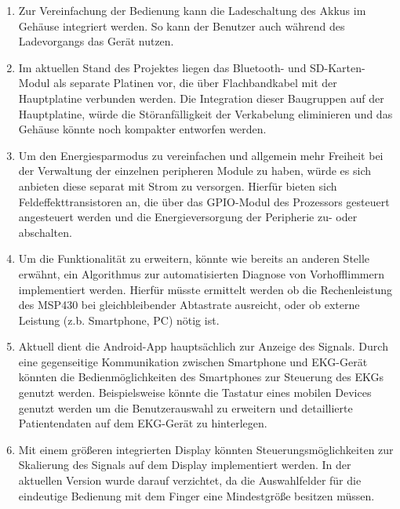 \begin{enumerate}

\item Zur Vereinfachung der Bedienung kann die Ladeschaltung des Akkus im Gehäuse integriert werden. So kann der Benutzer auch während des Ladevorgangs das Gerät nutzen.

\item Im aktuellen Stand des Projektes liegen das Bluetooth- und SD-Karten-Modul als separate Platinen vor, die über Flachbandkabel mit der Hauptplatine verbunden werden. Die Integration dieser Baugruppen auf der Hauptplatine, würde die Störanfälligkeit der Verkabelung eliminieren und das Gehäuse könnte noch kompakter entworfen werden.

\item Um den Energiesparmodus zu vereinfachen und allgemein mehr Freiheit bei der Verwaltung der einzelnen peripheren Module zu haben, würde es sich anbieten diese separat mit Strom zu versorgen. Hierfür bieten sich Feldeffekttransistoren an, die über das GPIO-Modul des Prozessors gesteuert angesteuert werden und die Energieversorgung der Peripherie zu- oder abschalten.

\item Um die Funktionalität zu erweitern, könnte wie bereits an anderen Stelle erwähnt, ein Algorithmus zur automatisierten Diagnose von Vorhofflimmern implementiert werden. Hierfür müsste ermittelt werden ob die Rechenleistung des MSP430 bei gleichbleibender Abtastrate ausreicht, oder ob externe Leistung (z.b. Smartphone, PC) nötig ist.

\item Aktuell dient die Android-App hauptsächlich zur Anzeige des Signals. Durch eine gegenseitige Kommunikation zwischen Smartphone und EKG-Gerät könnten die Bedienmöglichkeiten des Smartphones zur Steuerung des EKGs genutzt werden. Beispielsweise könnte die Tastatur eines mobilen Devices genutzt werden um die Benutzerauswahl zu erweitern und detaillierte Patientendaten auf dem EKG-Gerät zu hinterlegen.

\item Mit einem größeren integrierten Display könnten Steuerungsmöglichkeiten zur Skalierung des Signals auf dem Display implementiert werden. In der aktuellen Version wurde darauf verzichtet, da die Auswahlfelder für die eindeutige Bedienung mit dem Finger eine Mindestgröße besitzen müssen.

\end{enumerate}